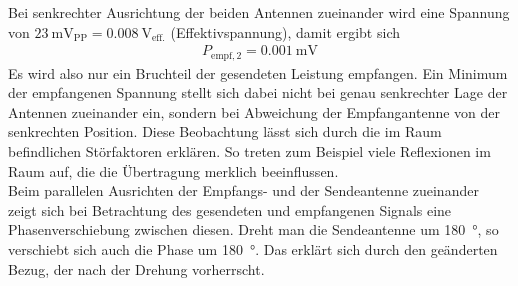 \documentclass[a4paper,twoside,final]{article}
\begin{document}
Bei senkrechter Ausrichtung der beiden Antennen zueinander wird eine Spannung von $\SI{23}{\milli\volt_\text{PP}} = \SI{0,008}{\volt_\text{eff.}}$ (Effektivspannung), damit ergibt sich
\begin{align}
P_{\text{empf},2} = \SI{0,001}{\milli\volt}
\end{align}
Es wird also nur ein Bruchteil der gesendeten Leistung empfangen. Ein Minimum der empfangenen Spannung stellt sich dabei nicht bei genau senkrechter Lage der Antennen zueinander ein, sondern bei Abweichung der Empfangantenne von der senkrechten Position. Diese Beobachtung lässt sich durch die im Raum befindlichen Störfaktoren
erklären. So treten zum Beispiel viele Reflexionen im Raum auf, die die Übertragung merklich beeinflussen. \\
Beim parallelen Ausrichten der Empfangs- und der Sendeantenne zueinander zeigt sich bei Betrachtung des gesendeten und empfangenen Signals eine Phasenverschiebung zwischen diesen. Dreht man die Sendeantenne um \SI{180}{\degree}, so verschiebt sich auch die Phase um \SI{180}{\degree}. Das erklärt sich durch den geänderten Bezug, der nach der Drehung vorherrscht.\\
\end{document}
